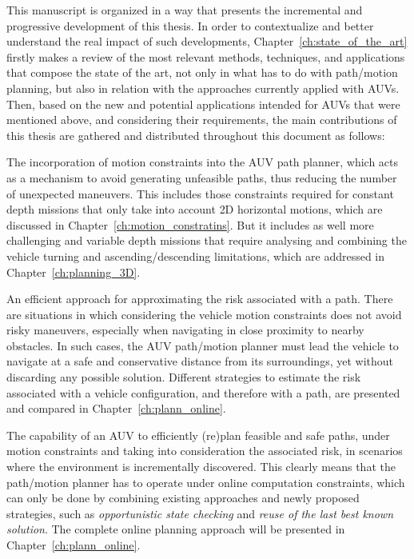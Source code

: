 This manuscript is organized in a way that presents the incremental and
progressive development of this thesis. In order to contextualize and better
understand the real impact of such developments,
Chapter~\ref{ch:state_of_the_art} firstly makes a review of the most relevant
methods, techniques, and applications that compose the state of the art, not
only in what has to do with path/motion planning, but also in relation with the
approaches currently applied with \acp{AUV}. Then, based on the new and
potential applications intended for \acp{AUV} that were mentioned above, and
considering their requirements, the main contributions of this thesis are
gathered and distributed throughout this document as follows:

\begin{inparaenum}[1)]

\item The incorporation of motion constraints into the \ac{AUV} path planner,
which acts as a mechanism to avoid generating unfeasible paths, thus reducing
the number of unexpected maneuvers. This includes those constraints required for
constant depth missions that only take into account \ac{2D} horizontal motions,
which are discussed in Chapter~\ref{ch:motion_constratins}. But it includes as
well more challenging and variable depth missions that require analysing and
combining the vehicle turning and ascending/descending limitations, which are
addressed in Chapter~\ref{ch:planning_3D}.

\item An efficient approach for approximating the risk associated with a path.
There are situations in which considering the vehicle motion constraints does
not avoid risky maneuvers, especially when navigating in close proximity to
nearby obstacles. In such cases, the \ac{AUV} path/motion planner must lead the
vehicle to navigate at a safe and conservative distance from its surroundings,
yet without discarding any possible solution. Different strategies to estimate
the risk associated with a vehicle configuration, and therefore with a path, are
presented and compared in Chapter~\ref{ch:plann_online}.

\item The capability of an \ac{AUV} to efficiently (re)plan feasible and safe
paths, \ie under motion constraints and taking into consideration the associated
risk, in scenarios where the environment is incrementally discovered.
This clearly means that the path/motion planner has to operate under online
computation constraints, which can only be done by combining existing approaches
and newly proposed strategies, such as \textit{opportunistic state checking}
and \textit{reuse of the last best known solution}. The complete online
planning approach will be presented in Chapter~\ref{ch:plann_online}.


\end{inparaenum}
